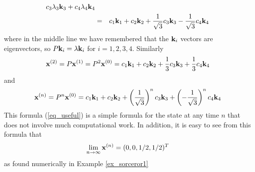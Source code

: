 \begin{example}
{\begin{eqnarray*}
      c_3 \lambda_3 {\bf k}_3 + c_4 \lambda_4 {\bf k}_4 \\
& = & c_1 {\bf k}_1 + c_2 {\bf k}_2 + 
      \frac{1}{\sqrt{3}} c_3 {\bf k}_3 -\frac{1}{\sqrt{3}} c_4 {\bf k}_4
\end{eqnarray*}
where in the middle line we have remembered that the ${\bf k}_i$ vectors 
are eigenvectors, so $P {\bf k}_i = \lambda {\bf k}_i$ for $i=1,2,3,4$. 
Similarly 
\[
{\bf x}^{(2)} = P {\bf x}^{(1)} = P^2 {\bf x}^{(0)} = 
    c_1 {\bf k}_1 + c_2 {\bf k}_2 +
      \frac{1}{3} c_3 {\bf k}_3 +\frac{1}{3} c_4 {\bf k}_4
\]
and 
\begin{equation}
\label{eq_useful}
{\bf x}^{(n)} = P^n {\bf x}^{(0)} = 
    c_1 {\bf k}_1 + c_2 {\bf k}_2 +
      \left(\frac{1}{\sqrt{3}}\right)^n c_3 {\bf k}_3 
      +\left(-\frac{1}{\sqrt{3}}\right)^n c_4 {\bf k}_4
\end{equation}
This formula (\ref{eq_useful}) is a simple formula for the state at any 
time $n$ that does not involve much computational work. In addition, it 
is easy to see from this formula that
\[
\lim_{n \rightarrow \infty} {\bf x}^{(n)} = (0,0,1/2,1/2)^T
\]
as found numerically in Example \ref{ex_sorceror1}
}
\end{example}

